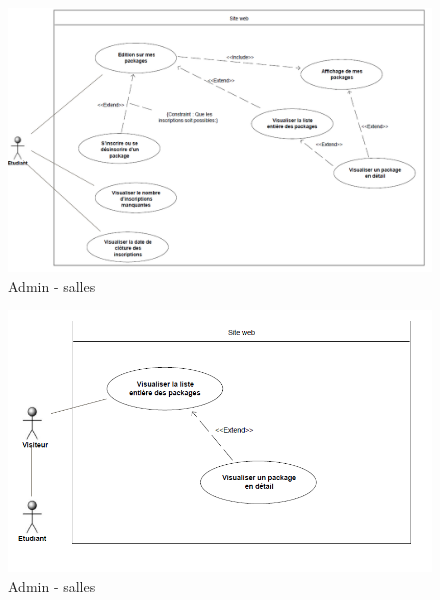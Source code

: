     \begin{figure}[h]
        \begin{center}
            \includegraphics[scale=0.50]{images/uml/etudiantMenuInitial.png} 
        \end{center}

        \caption{Admin - salles}
        \label{Admin - salles}
    \end{figure}

    \begin{figure}[h]
        \begin{center}
            \includegraphics[scale=0.50]{images/uml/visiteurMenu.png} 
        \end{center}

        \caption{Admin - salles}
        \label{Admin - salles}
    \end{figure}